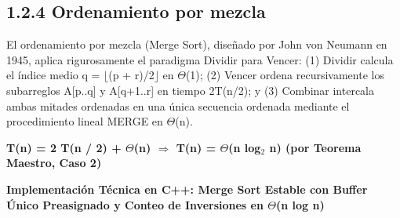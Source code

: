 \documentclass[11pt,letterpaper]{article}
\newcommand{\paddingbox}[1]{\fboxsep=6pt\relax#1}
\begin{document}
\subsection*{1.2.4 Ordenamiento por mezcla}
El ordenamiento por mezcla (Merge Sort), diseñado por John von Neumann en 1945, aplica rigurosamente el paradigma Dividir para Vencer: (1) Dividir calcula el índice medio q = $\lfloor$(p + r)/2$\rfloor$ en $\Theta$(1); (2) Vencer ordena recursivamente los subarreglos A[p..q] y A[q+1..r] en tiempo 2T(n/2); y (3) Combinar intercala ambas mitades ordenadas en una única secuencia ordenada mediante el procedimiento lineal MERGE en $\Theta$(n).\par
\begin{center}\colorbox{ipnblue!6}{\paddingbox{\textbf{\color{ipnblue}T(n) = 2 T(n / 2) + $\Theta$(n)   $\Longrightarrow$   T(n) = $\Theta$(n log$_2$ n)   (por Teorema Maestro, Caso 2)}}}\end{center}
\vspace{4pt}\noindent\textbf{\color{ipnblue}Implementación Técnica en C++: Merge Sort Estable con Buffer Único Preasignado y Conteo de Inversiones en $\Theta$(n log n)}\par\vspace{-2pt}
\end{document}
